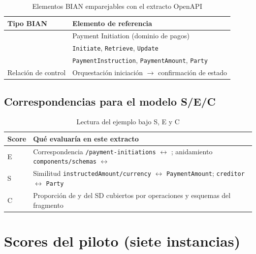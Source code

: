 \begin{table}[H]
  \centering
  \caption{Elementos BIAN emparejables con el extracto OpenAPI}
  \label{tab:anexo-f-bian}
  \small
  \begin{tabular}{@{}p{}p{}@{}}
    \toprule
    \textbf{Tipo BIAN} & \textbf{Elemento de referencia} \\
    \midrule
    \ServiceDomain{} & Payment Initiation (dominio de pagos) \\
    \Behavior{} & \texttt{Initiate}, \texttt{Retrieve}, \texttt{Update} \\
    \BusinessObject{} & \texttt{PaymentInstruction}, \texttt{PaymentAmount}, \texttt{Party} \\
    Relación de control & Orquestación iniciación $\rightarrow$ confirmación de estado \\
    \bottomrule
  \end{tabular}
\end{table}

\subsection{Correspondencias para el modelo S/E/C}

\begin{table}[H]
  \centering
  \caption{Lectura del ejemplo bajo S, E y C}
  \label{tab:anexo-f-scores}
  \small
  \begin{tabular}{@{}p{}p{}@{}}
    \toprule
    \textbf{Score} & \textbf{Qué evaluaría en este extracto} \\
    \midrule
    E &
    Correspondencia \texttt{/payment-initiations} $\leftrightarrow$ \Behavior{};
    anidamiento \texttt{components/schemas} $\leftrightarrow$ \BusinessObject{} \\
    S &
    Similitud \texttt{instructedAmount/currency} $\leftrightarrow$ \texttt{PaymentAmount};
    \texttt{creditor} $\leftrightarrow$ \texttt{Party} \\
    C &
    Proporción de \Behavior{} y \BusinessObject{} del SD cubiertos por operaciones y esquemas
    del fragmento \\
    \bottomrule
  \end{tabular}
\end{table}

\section{Scores del piloto (siete instancias)}

